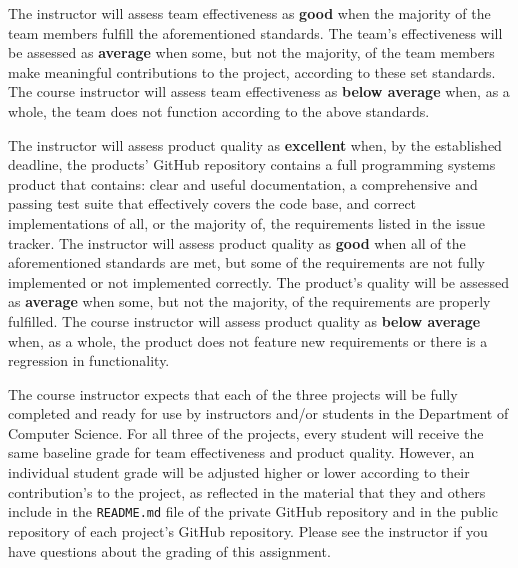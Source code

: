 \documentclass[11pt]{article}
\newcommand{\reflection}{\lstinline{README.md}}
\begin{document}
\vspace*{-.5em}

The instructor will assess team effectiveness as {\bf good} when the majority of the team members fulfill the
aforementioned standards. The team's effectiveness will be assessed as {\bf average} when some, but not the majority, of
the team members make meaningful contributions to the project, according to these set standards. The course instructor
will assess team effectiveness as {\bf below average} when, as a whole, the team does not function according to the
above standards.

The instructor will assess product quality as {\bf excellent} when, by the established deadline, the products' GitHub
repository contains a full programming systems product that contains: clear and useful documentation, a comprehensive
and passing test suite that effectively covers the code base, and correct implementations of all, or the majority of,
the requirements listed in the issue tracker. The instructor will assess product quality as {\bf good} when all of the
aforementioned standards are met, but some of the requirements are not fully implemented or not implemented correctly.
The product's quality will be assessed as {\bf average} when some, but not the majority, of the requirements are
properly fulfilled. The course instructor will assess product quality as {\bf below average} when, as a whole, the
product does not feature new requirements or there is a regression in functionality.

The course instructor expects that each of the three projects will be fully completed and ready for use by instructors
and/or students in the Department of Computer Science. For all three of the projects, every student will receive the
same baseline grade for team effectiveness and product quality. However, an individual student grade will be adjusted
higher or lower according to their contribution's to the project, as reflected in the material that they and others
include in the \reflection{} file of the private GitHub repository and in the public repository of each project's GitHub
repository. Please see the instructor if you have questions about the grading of this assignment.
\end{document}
